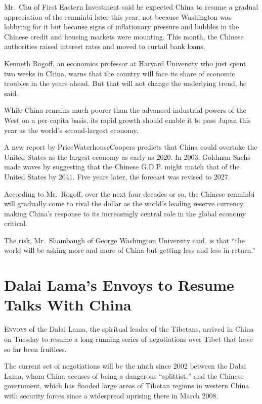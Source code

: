 ﻿\documentclass[12pt]{article}
\begin{document}
Mr.~Chu of First Eastern Investment said he expected China to resume a gradual appreciation of the
renminbi later this year, not because Washington was lobbying for it but because signs of
inflationary pressure and bubbles in the Chinese credit and housing markets were mounting. This
month, the Chinese authorities raised interest rates and moved to curtail bank loans.

Kenneth Rogoff, an economics professor at Harvard University who just spent two weeks in China,
warns that the country will face its share of economic troubles in the years ahead. But that will
not change the underlying trend, he said.

While China remains much poorer than the advanced industrial powers of the West on a per-capita
basis, its rapid growth should enable it to pass Japan this year as the world's second-largest
economy.

A new report by PriceWaterhouseCoopers predicts that China could overtake the United States as the
largest economy as early as 2020. In 2003, Goldman Sachs made waves by suggesting that the Chinese
G.D.P. might match that of the United States by 2041. Five years later, the forecast was revised to
2027.

According to Mr.~Rogoff, over the next four decades or so, the Chinese renminbi will gradually come
to rival the dollar as the world's leading reserve currency, making China's response to its
increasingly central role in the global economy critical.

The risk, Mr.~Shambaugh of George Washington University said, is that ``the world will be asking
more and more of China but getting less and less in return.''

\section{Dalai Lama's Envoys to Resume Talks With China}

\lettrine{E}{nvoys} of the Dalai Lama, the spiritual leader of the Tibetans,
arrived in China on Tuesday to resume a long-running series of negotiations over Tibet that have so
far been fruitless.

The current set of negotiations will be the ninth since 2002 between the Dalai Lama, whom China
accuses of being a dangerous ``splittist,'' and the Chinese government, which has flooded large
areas of Tibetan regions in western China with security forces since a widespread uprising there in
March 2008.
\end{document}
